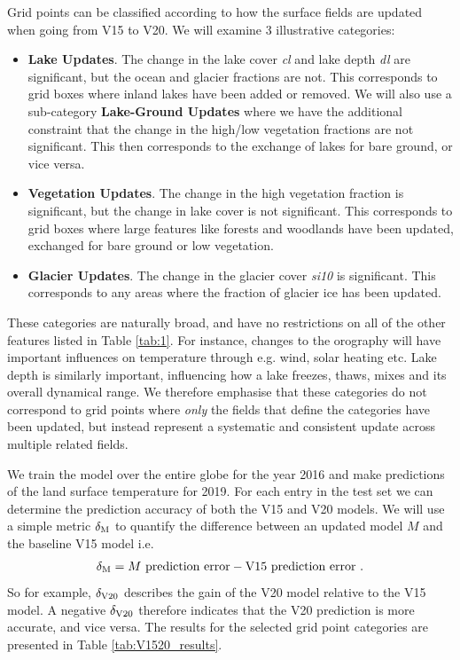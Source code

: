 \documentclass[twocolumn]{article}
\begin{document}
\noindent Grid points can be classified according to how the surface fields are updated when going from V15 to V20. We will examine 3 illustrative categories:
\begin{itemize}
	\item \textbf{Lake Updates}. The change in the lake cover \textit{cl} and lake depth \textit{dl} are significant, but the ocean and glacier fractions are not. This corresponds to grid boxes where inland lakes have been added or removed. We will also use a sub-category \textbf{Lake-Ground Updates} where we have the additional constraint that the change in the high/low vegetation fractions are not significant. This then corresponds to the exchange of lakes for bare ground, or vice versa.
	\item \textbf{Vegetation Updates}. The change in the high vegetation fraction is significant, but the change in lake cover is not significant. This corresponds to grid boxes where large features like forests and woodlands have been updated, exchanged for bare ground or low vegetation.
	\item \textbf{Glacier Updates}. The change in the glacier cover \textit{si10} is significant. This corresponds to any areas where the fraction of glacier ice has been updated.  
\end{itemize}
\noindent These categories are naturally broad, and have no restrictions on all of the other features listed in Table \ref{tab:1}. For instance, changes to the orography will have important influences on temperature through e.g. wind, solar heating etc. Lake depth is similarly important, influencing how a lake freezes, thaws, mixes and its overall dynamical range. We therefore emphasise that these categories do not correspond to grid points where \textit{only} the fields that define the categories have been updated, but instead represent a systematic and consistent update across multiple related fields. \newline 

\noindent We train the model over the entire globe for the year 2016 and make predictions of the land surface temperature for 2019. For each entry in the test set we can determine the prediction accuracy of both the V15 and V20 models. We will use a simple metric $\delta_{\rm M}$ to quantify the difference between an updated model $M$ and the baseline V15 model i.e.
\begin{eqnarray}
	\delta_{\rm M} = M \text{ prediction error} - \text{V15 prediction error} \ .
\end{eqnarray} 
So for example, $\delta_{\rm V20}$ describes the gain of the V20 model relative to the V15 model. A negative $\delta_{\rm V20}$ therefore indicates that the V20 prediction is more accurate, and vice versa. The results for the selected grid point categories are presented in Table \ref{tab:V1520_results}. \newline 
\end{document}
